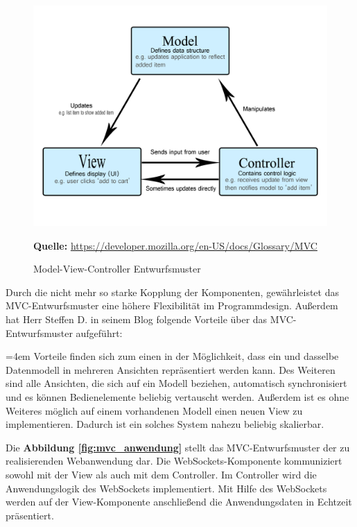\begin{figure}[H]
  \begin{center}
    \includegraphics[scale=0.55]{img/model_view_controller}
	\caption{Model-View-Controller Entwurfsmuster} 
	\footnotesize\sffamily\textbf{Quelle:} \url{https://developer.mozilla.org/en-US/docs/Glossary/MVC}
	\label{fig:mvc}
  \end{center}   
\end{figure}

Durch die nicht mehr so starke Kopplung der Komponenten, gewährleistet das MVC-Entwurfsmuster eine höhere Flexibilität im Programmdesign. Außerdem hat Herr Steffen D. in seinem Blog folgende Vorteile über das MVC-Entwurfsmuster aufgeführt:\bigskip

\par
\begingroup
\leftskip=4em %
\rightskip\leftskip
\noindent \glqq Vorteile finden sich zum einen in der Möglichkeit, dass ein und dasselbe Datenmodell in mehreren Ansichten repräsentiert werden kann. Des Weiteren sind alle Ansichten, die sich auf ein Modell beziehen, automatisch synchronisiert und es können Bedienelemente beliebig vertauscht werden. Außerdem ist es ohne Weiteres möglich auf einem vorhandenen Modell einen neuen View zu implementieren. Dadurch ist ein solches System nahezu beliebig skalierbar.\grqq{} \cite{Stef2018}
\par
\endgroup
\bigskip

\newpage
Die \textbf{Abbildung \ref{fig:mvc_anwendung}} stellt das MVC-Entwurfsmuster der zu realisierenden Webanwendung dar. Die WebSockets-Komponente kommuniziert sowohl mit der View als auch mit dem Controller. Im Controller wird die Anwendungslogik des WebSockets implementiert. Mit Hilfe des WebSockets werden auf der View-Komponente anschließend die Anwendungsdaten in Echtzeit präsentiert.\bigskip

